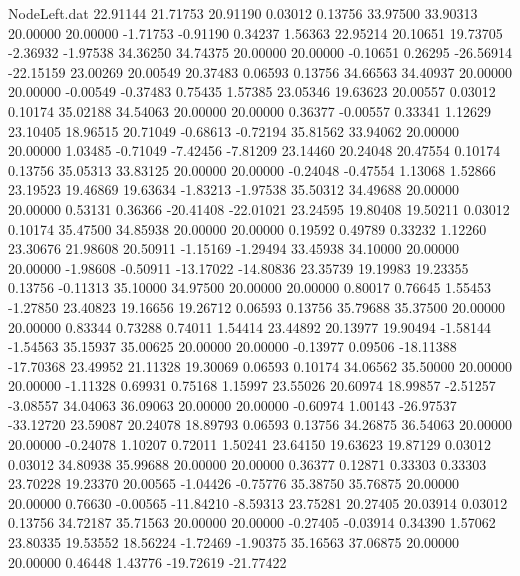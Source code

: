 \begin{filecontents}{NodeLeft.dat}
  22.91144   21.71753   20.91190     0.03012    0.13756   33.97500   33.90313   20.00000   20.00000   -1.71753   -0.91190    0.34237    1.56363
  22.95214   20.10651   19.73705    -2.36932   -1.97538   34.36250   34.74375   20.00000   20.00000   -0.10651    0.26295  -26.56914  -22.15159
  23.00269   20.00549   20.37483     0.06593    0.13756   34.66563   34.40937   20.00000   20.00000   -0.00549   -0.37483    0.75435    1.57385
  23.05346   19.63623   20.00557     0.03012    0.10174   35.02188   34.54063   20.00000   20.00000    0.36377   -0.00557    0.33341    1.12629
  23.10405   18.96515   20.71049    -0.68613   -0.72194   35.81562   33.94062   20.00000   20.00000    1.03485   -0.71049   -7.42456   -7.81209
  23.14460   20.24048   20.47554     0.10174    0.13756   35.05313   33.83125   20.00000   20.00000   -0.24048   -0.47554    1.13068    1.52866
  23.19523   19.46869   19.63634    -1.83213   -1.97538   35.50312   34.49688   20.00000   20.00000    0.53131    0.36366  -20.41408  -22.01021
  23.24595   19.80408   19.50211     0.03012    0.10174   35.47500   34.85938   20.00000   20.00000    0.19592    0.49789    0.33232    1.12260
  23.30676   21.98608   20.50911    -1.15169   -1.29494   33.45938   34.10000   20.00000   20.00000   -1.98608   -0.50911  -13.17022  -14.80836
  23.35739   19.19983   19.23355     0.13756   -0.11313   35.10000   34.97500   20.00000   20.00000    0.80017    0.76645    1.55453   -1.27850
  23.40823   19.16656   19.26712     0.06593    0.13756   35.79688   35.37500   20.00000   20.00000    0.83344    0.73288    0.74011    1.54414
  23.44892   20.13977   19.90494    -1.58144   -1.54563   35.15937   35.00625   20.00000   20.00000   -0.13977    0.09506  -18.11388  -17.70368
  23.49952   21.11328   19.30069     0.06593    0.10174   34.06562   35.50000   20.00000   20.00000   -1.11328    0.69931    0.75168    1.15997
  23.55026   20.60974   18.99857    -2.51257   -3.08557   34.04063   36.09063   20.00000   20.00000   -0.60974    1.00143  -26.97537  -33.12720
  23.59087   20.24078   18.89793     0.06593    0.13756   34.26875   36.54063   20.00000   20.00000   -0.24078    1.10207    0.72011    1.50241
  23.64150   19.63623   19.87129     0.03012    0.03012   34.80938   35.99688   20.00000   20.00000    0.36377    0.12871    0.33303    0.33303
  23.70228   19.23370   20.00565    -1.04426   -0.75776   35.38750   35.76875   20.00000   20.00000    0.76630   -0.00565  -11.84210   -8.59313
  23.75281   20.27405   20.03914     0.03012    0.13756   34.72187   35.71563   20.00000   20.00000   -0.27405   -0.03914    0.34390    1.57062
  23.80335   19.53552   18.56224    -1.72469   -1.90375   35.16563   37.06875   20.00000   20.00000    0.46448    1.43776  -19.72619  -21.77422

\end{filecontents}
